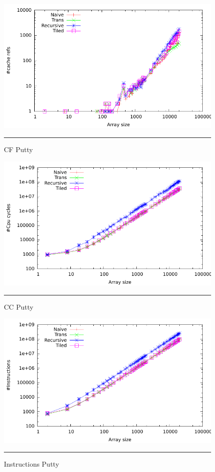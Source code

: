 \begin{figure}[htbp]
	\centering
		\includegraphics[width=\textwidth]{./Appendices/Figures/Project2a/Cache_refs_putty.pdf}
		\rule{35em}{0.5pt}
	\caption[Cache refs]{
	CF Putty
	}
	\label{fig:Cache_refs_p2putty}
\end{figure}
\begin{figure}[htbp]
	\centering
		\includegraphics[width=\textwidth]{./Appendices/Figures/Project2a/Cpu_cycles_putty.pdf}
		\rule{35em}{0.5pt}
	\caption[Cpu cycles]{
	CC Putty
	}
	\label{fig:Cpu_cycles_p2putty}
\end{figure}
\begin{figure}[htbp]
	\centering
		\includegraphics[width=\textwidth]{./Appendices/Figures/Project2a/Instructions_putty.pdf}
		\rule{35em}{0.5pt}
	\caption[Instructions putty]{
	Instructions Putty
	}
	\label{fig:Instructions_p2putty}
\end{figure}
